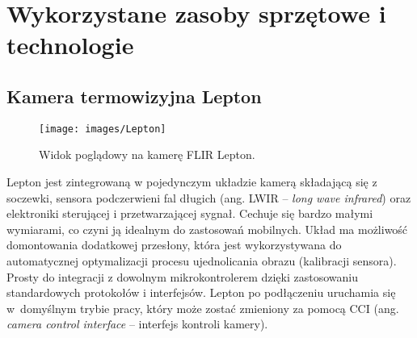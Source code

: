 \chapter{Wykorzystane zasoby sprzętowe i technologie}
\label{cha:hw}

\section{Kamera termowizyjna Lepton}

\begin{figure}[h]
    \centering
    \texttt{[image: images/Lepton]}
    \caption{Widok poglądowy na kamerę FLIR Lepton.}
    \label{fig:lepton}
\end{figure}
 
Lepton jest zintegrowaną w pojedynczym układzie kamerą składającą się z soczewki, sensora podczerwieni fal długich (ang. LWIR -- \textit{long wave infrared}) oraz elektroniki sterującej i przetwarzającej sygnał. 
Cechuje się bardzo małymi wymiarami, co czyni ją idealnym do zastosowań mobilnych. 
Układ ma możliwość domontowania dodatkowej przesłony, która jest wykorzystywana do automatycznej optymalizacji procesu ujednolicania obrazu (kalibracji sensora).
Prosty do integracji z dowolnym mikrokontrolerem dzięki zastosowaniu standardowych protokołów i interfejsów. %
Lepton po podłączeniu uruchamia się w~domyślnym trybie pracy, który może zostać zmieniony za pomocą CCI (ang. \textit{camera control interface} – interfejs kontroli kamery).\cite{lepton} %

